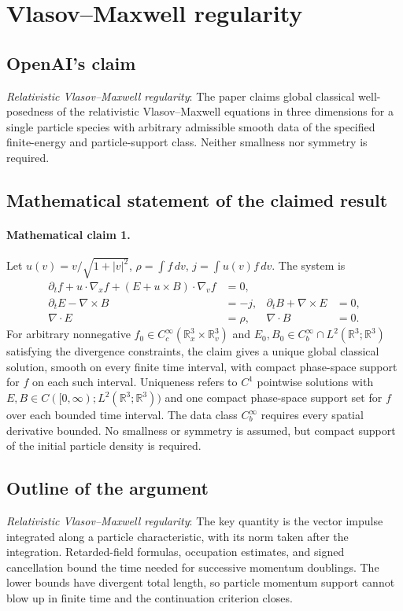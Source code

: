 \documentclass[11pt]{article}
\begin{document}
\section*{Vlasov–Maxwell regularity}

\subsection{OpenAI's claim}
\textit{Relativistic Vlasov--Maxwell regularity}: The paper claims global classical well-posedness of the relativistic Vlasov--Maxwell equations in three dimensions for a single particle species with arbitrary admissible smooth data of the specified finite-energy and particle-support class. Neither smallness nor symmetry is required.

\subsection{Mathematical statement of the claimed result}
\paragraph{Mathematical claim 1.} Let $u(v)=v/\sqrt{1+|v|^2}$, $\rho=\int f\,dv$, $j=\int u(v)f\,dv$. The system is \[\begin{aligned}\partial_tf+u\cdot\nabla_xf+(E+u\times B)\cdot\nabla_vf&=0,\\\partial_tE-\nabla\times B&=-j,&\partial_tB+\nabla\times E&=0,\\\nabla\cdot E&=\rho,&\nabla\cdot B&=0.\end{aligned}\] For arbitrary nonnegative $f_0\in C_c^\infty(\mathbb R_x^3\times\mathbb R_v^3)$ and $E_0,B_0\in C_b^\infty\cap L^2(\mathbb R^3;\mathbb R^3)$ satisfying the divergence constraints, the claim gives a unique global classical solution, smooth on every finite time interval, with compact phase-space support for $f$ on each such interval. Uniqueness refers to $C^1$ pointwise solutions with $E,B\in C([0,\infty);L^2(\mathbb R^3;\mathbb R^3))$ and one compact phase-space support set for $f$ over each bounded time interval. The data class $C_b^\infty$ requires every spatial derivative bounded. No smallness or symmetry is assumed, but compact support of the initial particle density is required.

\subsection{Outline of the argument}
\textit{Relativistic Vlasov--Maxwell regularity}: The key quantity is the vector impulse integrated along a particle characteristic, with its norm taken after the integration. Retarded-field formulas, occupation estimates, and signed cancellation bound the time needed for successive momentum doublings. The lower bounds have divergent total length, so particle momentum support cannot blow up in finite time and the continuation criterion closes.
\end{document}
